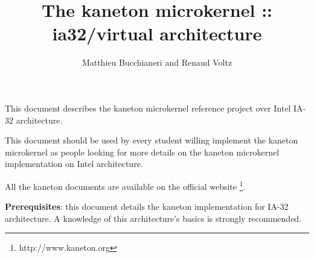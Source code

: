 
%
%

\def\path{../../..}

%
%



%
%

\rhead{}

%
%

\title{The kaneton microkernel :: ia32/virtual architecture
       \logos}

%
%

\author{\small{Matthieu Bucchianeri} and
        \small{Renaud Voltz}}

%
%



%
%

\maketitle

%
%

This document describes the kaneton microkernel reference project over
Intel IA-32 architecture.

This document should be used by every student willing implement the
kaneton microkernel as people looking for more details on the kaneton
microkernel implementation on Intel architecture.

All the kaneton documents are available on
the official website
  \footnote{http://www.kaneton.org}.

\textbf{Prerequisites}: this document details the kaneton implementation
for IA-32 architecture. A knowledge of this architecture's basics is
strongly recommended.

%
%

\tableofcontents

%
%











